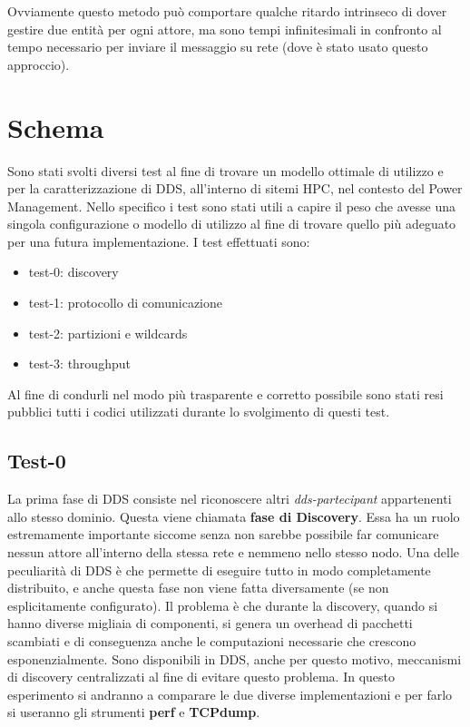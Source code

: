Ovviamente questo metodo può comportare qualche ritardo intrinseco di dover gestire due entità per ogni attore, ma sono tempi infinitesimali in confronto al tempo necessario per inviare il messaggio su rete (dove è stato usato questo approccio).

\section{Schema}
Sono stati svolti diversi test al fine di trovare un modello ottimale di utilizzo e per la caratterizzazione di DDS, all'interno di sitemi HPC, nel contesto del Power Management. Nello specifico i test sono stati utili a capire il peso che avesse una singola configurazione o modello di utilizzo al fine di trovare quello più adeguato per una futura implementazione. I test effettuati sono:

\begin{itemize}
    \item test-0: discovery
    \item test-1: protocollo di comunicazione
    \item test-2: partizioni e wildcards
    \item test-3: throughput
\end{itemize}


Al fine di condurli nel modo più trasparente e corretto possibile sono stati resi pubblici \cite{mygit} tutti i codici utilizzati durante lo svolgimento di questi test. %


\subsection{Test-0}
La prima fase di DDS consiste nel riconoscere altri \emph{dds-partecipant} appartenenti allo stesso dominio. Questa viene chiamata \textbf{fase di Discovery}. Essa ha un ruolo estremamente importante siccome senza non sarebbe possibile far comunicare nessun attore all'interno della stessa rete e nemmeno nello stesso nodo. Una delle peculiarità di DDS è che permette di eseguire tutto in modo completamente distribuito, e anche questa fase non viene fatta diversamente (se non esplicitamente configurato). Il problema è che durante la discovery, quando si hanno diverse migliaia di componenti, si genera un overhead di pacchetti scambiati e di conseguenza anche le computazioni necessarie che crescono esponenzialmente. %
Sono disponibili in DDS, anche per questo motivo, meccanismi di discovery centralizzati al fine di evitare questo problema. In questo esperimento si andranno a comparare le due diverse implementazioni e per farlo si useranno gli strumenti \textbf{perf} e \textbf{TCPdump}.

